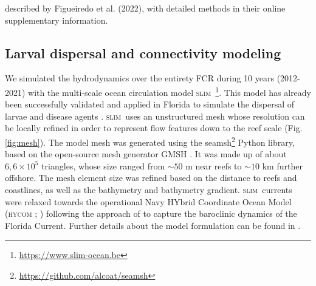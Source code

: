 \documentclass[preprint,12pt,authoryear]{elsarticle}
\newcommand{\hycom}{\textsc{hycom} }
\newcommand{\slim}{\textsc{slim}\ }
\begin{document}
described by Figueiredo et al. (2022), with detailed methods in their online supplementary information.
	
	\subsection*{Larval dispersal and connectivity modeling}
	
	We simulated the hydrodynamics over the entirety FCR during 10 years (2012-2021) with the multi-scale ocean circulation model \slim\footnote{\href{ https://www.slim-ocean.be}{https://www.slim-ocean.be}}. This model has already been successfully validated and applied in Florida to simulate the dispersal of larvae and disease agents \citep{frys2020fine,dobbelaere2020coupled,dobbelaere2022connecting}. \slim uses an unstructured mesh whose resolution can be locally refined in order to represent flow features down to the reef scale (Fig. \ref{fig:mesh}). The model mesh was generated using the seamsh\footnote{\href{https://github.com/alcoat/seamsh}{https://github.com/alcoat/seamsh}} Python library, based on the open-source mesh generator GMSH \citep{geuzaine2009gmsh}. It was made up of about $6,6\times 10^5$ triangles, whose size ranged from $\sim 50$ m near reefs to $\sim 10$ km further offshore. The mesh element size was refined based on the distance to reefs and coastlines, as well as the bathymetry and bathymetry gradient. \slim currents were relaxed towards the operational Navy HYbrid Coordinate Ocean Model (\hycom; \citealp{chassignet2007hycom}) following the approach of \citep{dobbelaere2022impacts} to capture the baroclinic dynamics of the Florida Current. Further details about the model formulation can be found in \citep{frys2020fine}.
	
\end{document}

